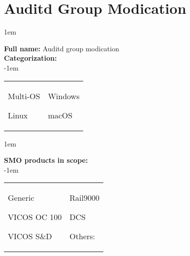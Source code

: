
%
%

\section{Auditd Group Modication}
\label{15602}

\openup 1em

\textbf{Full name:} Auditd group modication\hrulefill \\
{\bf Categorization:} \\

\openup -1em
\vspace{-3em}

\begin{tabular}{p{}p{}}

\begin{todolist}
  	\item Multi-OS
	\item[\done] Linux
\end{todolist}
&
\begin{todolist}
	\item Windows
	\item macOS
\end{todolist}

\end{tabular}

\openup 1em

{\bf SMO products in scope:} \\

\openup -1em
\vspace{-3em}

\begin{tabular}{p{}p{}}

\begin{todolist}
  \item[\done] Generic
  \item VICOS OC 100
  \item VICOS S\&D
\end{todolist}
&
\begin{todolist}
  \item[\done] Rail9000
  \item[\done] DCS
  \item Others: \hrulefill
\end{todolist}

\end{tabular}

